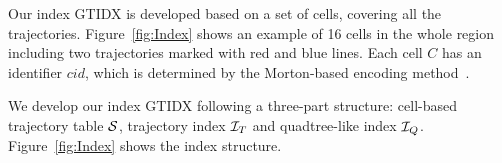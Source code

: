 \documentclass[10pt,conference,letterpaper]{IEEEtran}
\newcommand{\idxname}{GTIDX\xspace }
\newcommand{\allcell}{{\cal C}\xspace}
\newcommand{\trajtable}{{\cal S}\xspace}
\newcommand{\trajindex}{{{\cal I}_T}\xspace}
\newcommand{\treeindex}{{{\cal I}_Q}\xspace}
\begin{document}


Our index \idxname is developed based on a set of cells, covering all the trajectories.
Figure~\ref{fig:Index} shows an example of 16 cells in the whole region including two trajectories marked with red and blue lines.
Each cell $C$ has an identifier $cid$, which is determined by the Morton-based encoding method~\cite{morton1966computer}.


We develop our index \idxname following a three-part structure: cell-based trajectory table $\trajtable$, trajectory index $\trajindex$ and quadtree-like index $\treeindex$. Figure~\ref{fig:Index} shows the index structure.

\end{document}
